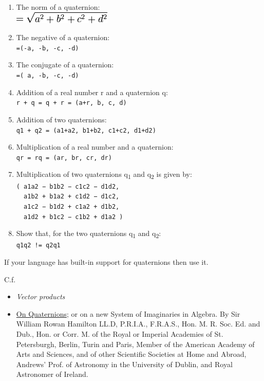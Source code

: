 \begin{enumerate}
\item
  The norm of a
  quaternion:\\\includegraphics[scale=.6]{graphics/cac27278c238ea97dbd86baa6afd19fe.png}
\item
  The negative of a quaternion:\\\texttt{=(-a, -b, -c, -d)}
\item
  The conjugate of a quaternion:\\\texttt{=( a, -b, -c, -d)}
\item
  Addition of a real number r and a quaternion
  q:\\\texttt{r + q = q + r = (a+r, b, c, d)}
\item
  Addition of two
  quaternions:\\\texttt{q1 + q2 = (a1+a2, b1+b2, c1+c2, d1+d2)}
\item
  Multiplication of a real number and a
  quaternion:\\\texttt{qr = rq = (ar, br, cr, dr)}
\item
  Multiplication of two quaternions q\textsubscript{1} and
  q\textsubscript{2} is given
  by:\\\texttt{( a1a2 − b1b2 − c1c2 − d1d2,}\\\texttt{~ a1b2 + b1a2 + c1d2 − d1c2,}\\\texttt{~ a1c2 − b1d2 + c1a2 + d1b2,}\\\texttt{~ a1d2 + b1c2 − c1b2 + d1a2 )}
\item
  Show that, for the two quaternions q\textsubscript{1} and
  q\textsubscript{2}:\\\texttt{q1q2~!= q2q1}
\end{enumerate}

If your language has built-in support for quaternions then use it.

C.f.

\begin{itemize}
\item
  \emph{Vector products}
\item
  \href{http://www.maths.tcd.ie/pub/HistMath/People/Hamilton/QLetter/QLetter.pdf}{On
  Quaternions}; or on a new System of Imaginaries in Algebra. By Sir
  William Rowan Hamilton LL.D, P.R.I.A., F.R.A.S., Hon. M. R. Soc. Ed.
  and Dub., Hon. or Corr. M. of the Royal or Imperial Academies of St.
  Petersburgh, Berlin, Turin and Paris, Member of the American Academy
  of Arts and Sciences, and of other Scientific Societies at Home and
  Abroad, Andrews' Prof. of Astronomy in the University of Dublin, and
  Royal Astronomer of Ireland.
\end{itemize}


